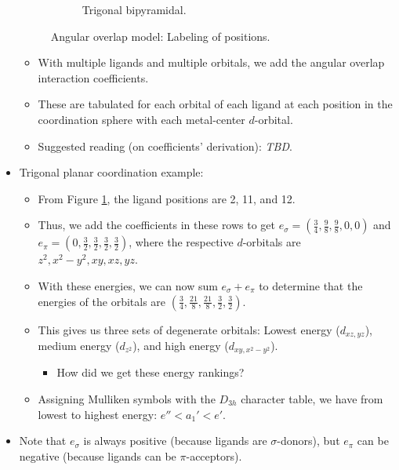 \documentclass[../notes.tex]{subfiles}
\begin{document}
\begin{itemize}
\begin{figure}[h!]
\begin{subfigure}[b]{0.3\linewidth}
            \caption{Trigonal bipyramidal.}
            \label{fig:AOM-positionLabelingc}
        \end{subfigure}
        \caption{Angular overlap model: Labeling of positions.}
        \label{fig:AOM-positionLabeling}
    \end{figure}
    \begin{itemize}
        \item With multiple ligands and multiple orbitals, we add the angular overlap interaction coefficients.
        \item These are tabulated for each orbital of each ligand at each position in the coordination sphere with each metal-center $d$-orbital.
        \item Suggested reading (on coefficients' derivation): \emph{TBD}.
    \end{itemize}
    \item Trigonal planar coordination example:
    \begin{itemize}
        \item From Figure \ref{fig:AOM-positionLabelingc}, the ligand positions are 2, 11, and 12.
        \item Thus, we add the coefficients in these rows to get $e_\sigma=(\frac{3}{4},\frac{9}{8},\frac{9}{8},0,0)$ and $e_\pi=(0,\frac{3}{2},\frac{3}{2},\frac{3}{2},\frac{3}{2})$, where the respective $d$-orbitals are $z^2,x^2-y^2,xy,xz,yz$.
        \item With these energies, we can now sum $e_\sigma+e_\pi$ to determine that the energies of the orbitals are $(\frac{3}{4},\frac{21}{8},\frac{21}{8},\frac{3}{2},\frac{3}{2})$.
        \item This gives us three sets of degenerate orbitals: Lowest energy ($d_{xz,yz}$), medium energy ($d_{z^2}$), and high energy ($d_{xy,x^2-y^2}$).
        \begin{itemize}
            \item How did we get these energy rankings?
        \end{itemize}
        \item Assigning Mulliken symbols with the $D_{3h}$ character table, we have from lowest to highest energy: $e''<a_1'<e'$.
    \end{itemize}
    \item Note that $e_\sigma$ is always positive (because ligands are $\sigma$-donors), but $e_\pi$ can be negative (because ligands can be $\pi$-acceptors).

\end{itemize}
\end{document}
